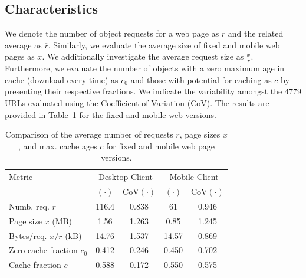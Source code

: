 \documentclass[letterpaper,conference]{IEEEtran}
\begin{document}
\subsection{Characteristics}
We denote the number of object requests for a web page as $r$ and the related average as $\overline{r}$. Similarly, we evaluate the average size of fixed and mobile web pages as $x$. We additionally investigate the average request size as $\frac{x}{r}$. 
Furthermore, we evaluate the number of objects with a zero maximum age in cache (download every time) as $c_0$ and those with potential for caching as $c$ by presenting their respective fractions.
We indicate the variability amongst the 4779 URLs evaluated using the Coefficient of Variation (CoV). 
The results are provided in Table~\ref{tab:res} for the fixed and mobile web versions.
\begin{table}[b]
	\centering
	\caption{Comparison of the average number of requests $r$, page sizes $x$, and max. cache ages $c$ for fixed and mobile web page versions.\label{tab:res}}
	\begin{tabular}{|l||c|c||c|c|}
		\hline
		Metric                    & \multicolumn{2}{|c||}{Desktop Client} & \multicolumn{2}{|c|}{Mobile Client} \\
		& $\overline{(\cdot)}$ &  CoV$(\cdot)$  & $\overline{(\cdot)}$ & CoV$(\cdot)$ \\ \hline
		Numb. req. $r$            &        116.4         &     0.838      &          61          &    0.946     \\ \hline
		Page size $x$ (MB)        &         1.56         &     1.263      &         0.85         &    1.245     \\ \hline
		Bytes/req. $x/r$ (kB)     &        14.76         &     1.537      &        14.57         &    0.869     \\ \hline
		Zero cache fraction $c_0$ &        0.412         &     0.246      &        0.450         &    0.702     \\ \hline
		Cache fraction $c$        &        0.588         &     0.172      &        0.550         &    0.575     \\ \hline
	\end{tabular}
\end{table} 
\end{document}
